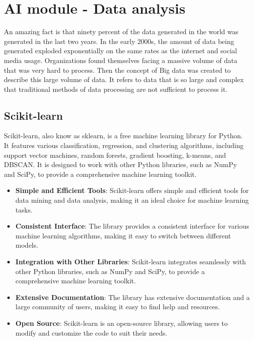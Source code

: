 \section{AI module - Data analysis}

An amazing fact is that ninety percent of the data generated in the world was generated in the last two years. In the early 2000s, the amount of data being
generated exploded exponentially on the same rates as the internet and social media usage. Organizations found themselves facing a massive volume of data 
that was very hard to process. Then the concept of Big data was created to describe this large volume of data. It refers to data that is so large and complex
that traditional methods of data processing are not sufficient to process it. \cite{bigdata}


\subsection{Scikit-learn}

Scikit-learn, also know as sklearn, is a free machine learning library for Python. It features various classification, regression, and clustering algorithms, including support vector machines, 
random forests, gradient boosting, k-means, and DBSCAN. It is designed to work with other Python libraries, such as NumPy and SciPy, to provide a comprehensive machine learning toolkit. \cite{scikit}


\begin{itemize}
    \item \textbf{Simple and Efficient Tools}: Scikit-learn offers simple and efficient tools for data mining and data analysis, making it an ideal choice for machine learning tasks.
    \item \textbf{Consistent Interface}: The library provides a consistent interface for various machine learning algorithms, making it easy to switch between different models.
    \item \textbf{Integration with Other Libraries}: Scikit-learn integrates seamlessly with other Python libraries, such as NumPy and SciPy, to provide a comprehensive machine learning toolkit.
    \item \textbf{Extensive Documentation}: The library has extensive documentation and a large community of users, making it easy to find help and resources.
    \item \textbf{Open Source}: Scikit-learn is an open-source library, allowing users to modify and customize the code to suit their needs.
\end{itemize}

